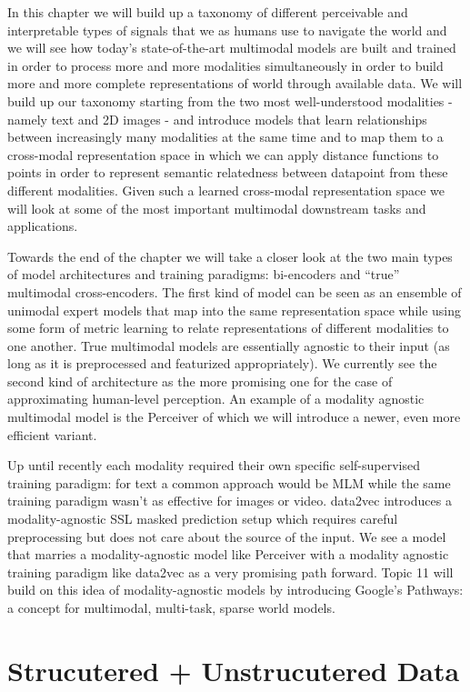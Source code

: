 \documentclass[
]{krantz}
\begin{document}
In this chapter we will build up a taxonomy of different perceivable and interpretable types of signals that we as humans use to navigate the world and we will see how today's state-of-the-art multimodal models are built and trained in order to process more and more modalities simultaneously in order to build more and more complete representations of world through available data. We will build up our taxonomy starting from the two most well-understood modalities - namely text and 2D images - and introduce models that learn relationships between increasingly many modalities at the same time and to map them to a cross-modal representation space in which we can apply distance functions to points in order to represent semantic relatedness between datapoint from these different modalities.
Given such a learned cross-modal representation space we will look at some of the most important multimodal downstream tasks and applications.

Towards the end of the chapter we will take a closer look at the two main types of model architectures and training paradigms: bi-encoders and ``true'' multimodal cross-encoders. The first kind of model can be seen as an ensemble of unimodal expert models that map into the same representation space while using some form of metric learning to relate representations of different modalities to one another. True multimodal models are essentially agnostic to their input (as long as it is preprocessed and featurized appropriately). We currently see the second kind of architecture as the more promising one for the case of approximating human-level perception. An example of a modality agnostic multimodal model is the Perceiver of which we will introduce a newer, even more efficient variant.

Up until recently each modality required their own specific self-supervised training paradigm: for text a common approach would be MLM while the same training paradigm wasn't as effective for images or video. data2vec introduces a modality-agnostic SSL masked prediction setup which requires careful preprocessing but does not care about the source of the input. We see a model that marries a modality-agnostic model like Perceiver with a modality agnostic training paradigm like data2vec as a very promising path forward.
Topic 11 will build on this idea of modality-agnostic models by introducing Google's Pathways: a concept for multimodal, multi-task, sparse world models.

\hypertarget{strucutered-unstrucutered-data}{%
\chapter{Strucutered + Unstrucutered Data}\label{strucutered-unstrucutered-data}}
\end{document}
